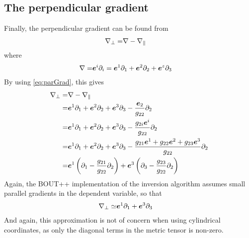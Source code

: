 \subsection{The perpendicular gradient}
%
Finally, the perpendicular gradient can be found from
\begin{align*}
    \nabla_\perp =& \nabla - \nabla_\|
\end{align*}
%
where
%
\begin{align*}
    \nabla =& \boldsymbol{e}^i \partial_i = \boldsymbol{e}^1 \partial_1 + \boldsymbol{e}^2 \partial_2 + \boldsymbol{e}^z \partial_3
\end{align*}
%
By using \cref{eq:parGrad}, this gives
%
\begin{align*}
    \grad_\perp =& \grad - \grad_\|\\
%
                =& \ve{e}^1 \partial_1 + \ve{e}^2 \partial_2 + \ve{e}^3
    \partial_3 - \frac{\ve{e}_2}{g_{22}} \partial_2\\
%
                =& \ve{e}^1 \partial_1 + \ve{e}^2 \partial_2 + \ve{e}^3
    \partial_3 - \frac{g_{2i}\ve{e}^i}{g_{22}} \partial_2\\
%
                =& \ve{e}^1 \partial_1 + \ve{e}^2 \partial_2 + \ve{e}^3
    \partial_3 - \frac{g_{21}\ve{e}^1 +g_{22}\ve{e}^2 +g_{23}\ve{e}^3
    }{g_{22}}\partial_2\\
%
                =& \ve{e}^1 \L(\partial_1 - \frac{g_{21}}{g_{22}}\partial_2\R)
    +  \ve{e}^3 \L(\partial_3 - \frac{g_{23}}{g_{22}}\partial_2\R)
\end{align*}
%
Again, the BOUT++ implementation of the inversion algorithm assumes small parallel gradients in the dependent variable, so that
%
\begin{align}
    \nabla_\perp \simeq& \boldsymbol{e}^1 \partial_1 +  \boldsymbol{e}^3 \partial_3
    \label{eq:approxPerpGrad}
\end{align}
%
And again, this approximation is not of concern when using cylindrical coordinates, as only the diagonal terms in the metric tensor is non-zero.


